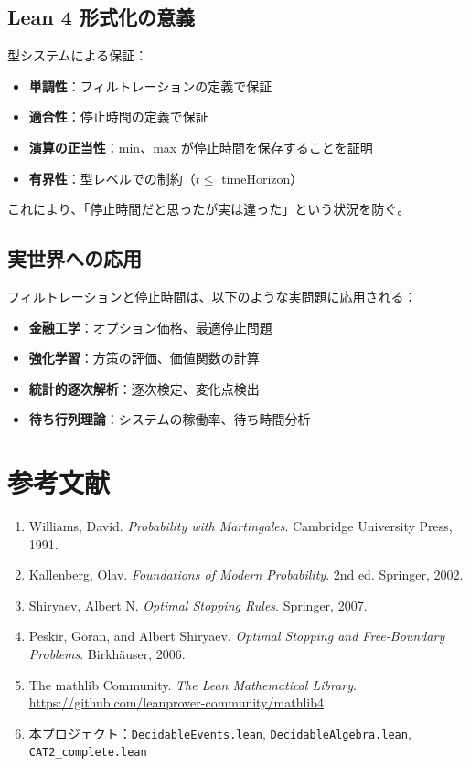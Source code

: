\documentclass[12pt,a4paper,ja=standard]{bxjsarticle}
\theoremstyle{definition}
\begin{document}
\subsection{Lean 4 形式化の意義}

\begin{keypoint}
型システムによる保証：

\begin{itemize}
    \item \textbf{単調性}：フィルトレーションの定義で保証
    \item \textbf{適合性}：停止時間の定義で保証
    \item \textbf{演算の正当性}：min、max が停止時間を保存することを証明
    \item \textbf{有界性}：型レベルでの制約（$t \leq$ timeHorizon）
\end{itemize}

これにより、「停止時間だと思ったが実は違った」という状況を防ぐ。
\end{keypoint}

\subsection{実世界への応用}

フィルトレーションと停止時間は、以下のような実問題に応用される：

\begin{itemize}
    \item \textbf{金融工学}：オプション価格、最適停止問題
    \item \textbf{強化学習}：方策の評価、価値関数の計算
    \item \textbf{統計的逐次解析}：逐次検定、変化点検出
    \item \textbf{待ち行列理論}：システムの稼働率、待ち時間分析
\end{itemize}

\section*{参考文献}

\begin{enumerate}
    \item Williams, David. \textit{Probability with Martingales}. Cambridge University Press, 1991.
    \item Kallenberg, Olav. \textit{Foundations of Modern Probability}. 2nd ed. Springer, 2002.
    \item Shiryaev, Albert N. \textit{Optimal Stopping Rules}. Springer, 2007.
    \item Peskir, Goran, and Albert Shiryaev. \textit{Optimal Stopping and Free-Boundary Problems}. Birkhäuser, 2006.
    \item The mathlib Community. \textit{The Lean Mathematical Library}. \url{https://github.com/leanprover-community/mathlib4}
    \item 本プロジェクト：\texttt{DecidableEvents.lean}, \texttt{DecidableAlgebra.lean}, \texttt{CAT2\_complete.lean}
\end{enumerate}
\end{document}
